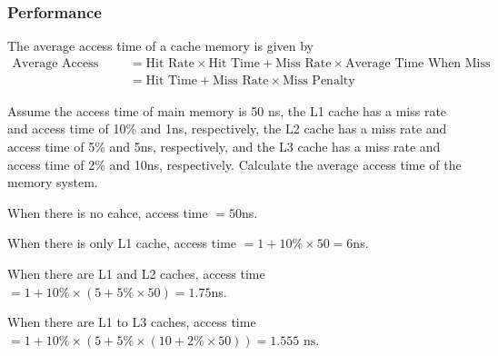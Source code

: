 \subsubsection{Performance}

\begin{definition}
    The average access time of a cache memory is given by
    \begin{align*}
        \text{Average Access Time}
        &= \text{Hit Rate} \times \text{Hit Time} + \text{Miss Rate} \times \text{Average Time When Miss} \\
        &= \text{Hit Time} + \text{Miss Rate} \times \text{Miss Penalty}
    \end{align*}
\end{definition}

\begin{example}
    Assume the access time of main memory is 50 ns, the L1 cache has a miss rate and access
    time of 10\% and 1ns, respectively, the L2 cache has a miss rate and access time
    of 5\% and 5ns, respectively, and the L3 cache has a miss rate and access time of 2\%
    and 10ns, respectively. Calculate the average access time of the memory system.

    \begin{solution}
        When there is no cahce, access time $=50$ns.

        When there is only L1 cache, access time $=1+10\%\times 50=6$ns.

        When there are L1 and L2 caches, access time $=1+10\%\times(5+5\%\times 50)=1.75$ns.

        When there are L1 to L3 caches, access time $=1+10\%\times(5+5\%\times(10+2\%\times 50))=\boxed{1.555\text{ ns}}$.
    \end{solution}
\end{example}